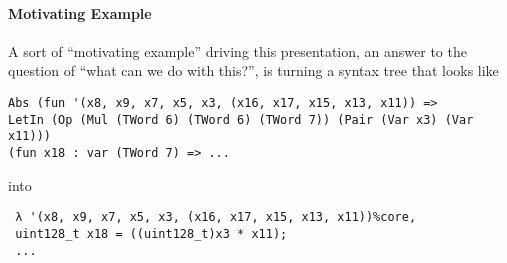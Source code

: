 \documentclass{article}
\begin{document}
\paragraph{Motivating Example} A sort of ``motivating example'' driving this presentation, an answer to the question of ``what can we do with this?'', is turning a syntax tree that looks like
\begin{verbatim}
Abs (fun '(x8, x9, x7, x5, x3, (x16, x17, x15, x13, x11)) =>
LetIn (Op (Mul (TWord 6) (TWord 6) (TWord 7)) (Pair (Var x3) (Var x11)))
(fun x18 : var (TWord 7) => ...
\end{verbatim}
into
\begin{verbatim}
 λ '(x8, x9, x7, x5, x3, (x16, x17, x15, x13, x11))%core,
 uint128_t x18 = ((uint128_t)x3 * x11);
 ...
\end{verbatim}
\end{document}
